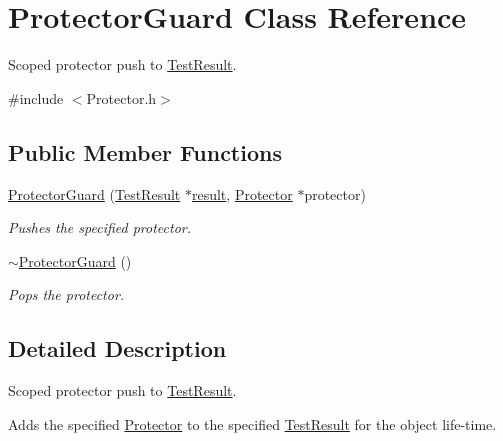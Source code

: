 \hypertarget{class_protector_guard}{\section{Protector\-Guard Class Reference}
\label{class_protector_guard}
}


Scoped protector push to \hyperlink{class_test_result}{Test\-Result}.  




{\ttfamily \#include $<$Protector.\-h$>$}

\subsection*{Public Member Functions}
\begin{DoxyCompactItemize}
\item 
\hyperlink{class_protector_guard_abc4a3b2b51b6d93fb3dd9fed1bbc85db}{Protector\-Guard} (\hyperlink{class_test_result}{Test\-Result} $\ast$\hyperlink{glew_8h_a5fb5836a37f7607602a16ad733ed6357}{result}, \hyperlink{class_protector}{Protector} $\ast$protector)
\begin{DoxyCompactList}\small\item\em Pushes the specified protector. \end{DoxyCompactList}\item 
\hyperlink{class_protector_guard_af80b574cc5999746e77ec13d2d0093f5}{$\sim$\-Protector\-Guard} ()
\begin{DoxyCompactList}\small\item\em Pops the protector. \end{DoxyCompactList}\end{DoxyCompactItemize}


\subsection{Detailed Description}
Scoped protector push to \hyperlink{class_test_result}{Test\-Result}. 

Adds the specified \hyperlink{class_protector}{Protector} to the specified \hyperlink{class_test_result}{Test\-Result} for the object life-\/time. 

